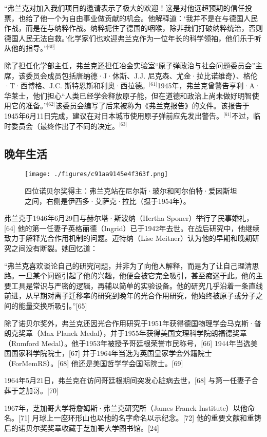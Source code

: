 “弗兰克对加入我们项目的邀请表示了极大的欢迎！这是对他远超预期的信任投票，也给了他一个为自由事业做贡献的机会。他解释道：‘我并不是在与德国人民作战，而是在与纳粹作战。纳粹扼住了德国的咽喉，除非我们打破纳粹统治，否则德国人民无法自救。’化学家们也欢迎弗兰克作为一位年长的科学领袖，他们乐于听从他的指导。”\(^\text{[60]}\)

除了担任化学部主任，弗兰克还担任冶金实验室“原子弹政治与社会问题委员会”主席，该委员会成员包括唐纳德·J·休斯、J.J. 尼克森、尤金·拉比诺维奇）、格伦·T·西博格、J.C. 斯特恩斯和利奥·西拉德。\(^\text{[61]}\)1945年，弗兰克曾警告亨利·A·华莱士，他们担心“人类已经学会释放原子能，但在道德和政治上尚未做好明智使用它的准备。”\(^\text{[62]}\)该委员会编写了后来被称为《弗兰克报告》的文件。该报告于1945年6月11日完成，建议在对日本城市使用原子弹前应先发出警告。\(^\text{[61]}\)不过，临时委员会（最终作出了不同的决定。\(^\text{[63]}\)
\subsection{晚年生活}
\begin{figure}[ht]
\centering
\texttt{[image: ./figures/c91aa9145e4f363f.png]}
\caption{四位诺贝尔奖得主：弗兰克站在尼尔斯·玻尔和阿尔伯特·爱因斯坦之间，右侧是伊西多·艾萨克·拉比（摄于1954年）。} \label{fig_ZMSflk_3}
\end{figure}
弗兰克于1946年6月29日与赫尔塔·斯波纳（Hertha Sponer）举行了民事婚礼，[64] 他的第一任妻子英格丽德（Ingrid）已于1942年去世。在战后研究中，他继续致力于解释光合作用机制的问题。迈特纳（Lise Meitner）认为他的早期和晚期研究之间没有断裂。她回忆道：

“弗兰克喜欢谈论自己的研究问题，并非为了向他人解释，而是为了让自己理清思路。一旦某个问题引起了他的兴趣，他便会被它完全吸引，甚至痴迷于此。他的主要工具是常识与严密的逻辑，再辅以简单的实验设备。他的研究几乎沿着一条直线前进，从早期对离子迁移率的研究到晚年的光合作用研究，他始终被原子或分子之间的能量交换所吸引。”[65]

除了诺贝尔奖外，弗兰克还因光合作用研究于1951年获得德国物理学会马克斯·普朗克奖章（Max Planck Medal），并于1955年获得美国文理科学院朗福德奖章（Rumford Medal）。他于1953年被授予哥廷根荣誉市民称号，[66] 1944年当选美国国家科学院院士，[67] 并于1964年当选为英国皇家学会外籍院士（ForMemRS）。[68] 他还是美国哲学学会国际院士。[69]

1964年5月21日，弗兰克在访问哥廷根期间突发心脏病去世，[68] 与第一任妻子合葬于芝加哥。[70]

1967年，芝加哥大学将詹姆斯·弗兰克研究所（James Franck Institute）以他命名。[71] 月球上一座环形山也以他的名字命名以示纪念。[72] 他的重要文献和重铸后的诺贝尔奖奖章收藏于芝加哥大学图书馆。[24]
